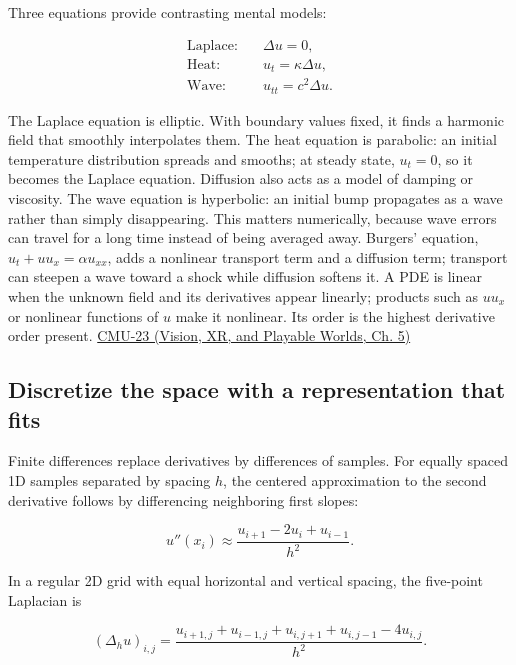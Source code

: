 Three equations provide contrasting mental models:

\[
\begin{aligned}
\text{Laplace:}\quad &\Delta u=0,\\
\text{Heat:}\quad &u_t=\kappa\Delta u,\\
\text{Wave:}\quad &u_{tt}=c^2\Delta u.
\end{aligned}
\]

The Laplace equation is elliptic. With boundary values fixed, it finds a harmonic field that smoothly interpolates them. The heat equation is parabolic: an initial temperature distribution spreads and smooths; at steady state, \(u_t=0\), so it becomes the Laplace equation. Diffusion also acts as a model of damping or viscosity. The wave equation is hyperbolic: an initial bump propagates as a wave rather than simply disappearing. This matters numerically, because wave errors can travel for a long time instead of being averaged away. Burgers' equation, \(u_t+u u_x=\alpha u_{xx}\), adds a nonlinear transport term and a diffusion term; transport can steepen a wave toward a shock while diffusion softens it. A PDE is linear when the unknown field and its derivatives appear linearly; products such as \(u u_x\) or nonlinear functions of \(u\) make it nonlinear. Its order is the highest derivative order present. \href{../07-Vision-XR-and-Playable-Worlds/main.pdf\#nameddest=04-visual-computing-ii-ch036-cmu-23---physically-based-animation-and-pdes}{CMU-23 (Vision, XR, and Playable Worlds, Ch. 5)}

\subsection{Discretize the space with a representation that fits}\label{04-visual-computing-ii-ch030-discretize-the-space-with-a-representation-that-fits}

\hypertarget{04-visual-computing-ii-ch030-discretize-the-space-with-a-representation-that-fits}{}

Finite differences replace derivatives by differences of samples. For equally spaced 1D samples separated by spacing \(h\), the centered approximation to the second derivative follows by differencing neighboring first slopes:

\[
u''(x_i)\approx\frac{u_{i+1}-2u_i+u_{i-1}}{h^2}.
\]

In a regular 2D grid with equal horizontal and vertical spacing, the five-point Laplacian is

\[
(\Delta_h u)_{i,j}=\frac{u_{i+1,j}+u_{i-1,j}+u_{i,j+1}+u_{i,j-1}-4u_{i,j}}{h^2}.
\]

